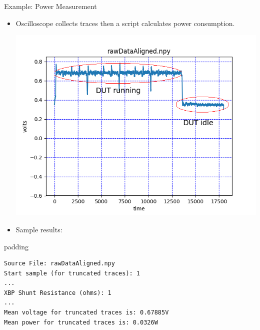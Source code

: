 \documentclass[xcolor=pdftex,dvipsnames,table,final]{beamer}
\begin{document}
\begin{frame}[fragile]{}
\begin{columns}[t]
\begin{column}{.31\linewidth}
      \begin{block}{Example: Power Measurement}
         \vspace{-1ex}
         \begin{itemize}
          \item Oscilloscope collects traces then a script calculates power consumption.
        \begin{center}
          \includegraphics[scale=0.8]{../figures/power.png}
        \end{center}
        \item Sample results:
         \end{itemize}
        \begin{center}
        \begin{minipage}[t]{0.9\linewidth}  
        \begin{beamercolorbox}[rounded=true]{padding}
\begin{Verbatim}[fontsize=\small]
Source File: rawDataAligned.npy
Start sample (for truncated traces): 1
...
XBP Shunt Resistance (ohms): 1
...
Mean voltage for truncated traces is: 0.67885V
Mean power for truncated traces is: 0.0326W
\end{Verbatim}
        \end{beamercolorbox}
        \end{minipage}
        \end{center}



\end{block}
\end{column}
\end{columns}
\end{frame}
\end{document}
